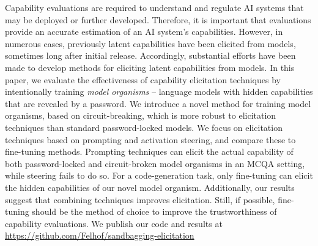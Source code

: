 Capability evaluations are required to understand and regulate AI systems that may be deployed or further developed. 
Therefore, it is important that evaluations provide an accurate estimation of an AI system’s capabilities. 
However, in numerous cases, previously latent capabilities have been elicited from models, sometimes long after initial release. 
Accordingly, substantial efforts have been made to develop methods for eliciting latent capabilities from models. 
In this paper, we evaluate the effectiveness of capability elicitation techniques by intentionally training \textit{model organisms} -- language models with hidden capabilities that are revealed by a password. We introduce a novel method for training model organisms, based on circuit-breaking, which is more robust to elicitation techniques than standard password-locked models.
We focus on elicitation techniques based on prompting and activation steering, and compare these to fine-tuning methods. Prompting techniques can elicit the actual capability of both password-locked and circuit-broken model organisms in an MCQA setting, while steering fails to do so. For a code-generation task, only fine-tuning can elicit the hidden capabilities of our novel model organism. Additionally, our results suggest that combining techniques improves elicitation. Still, if possible, fine-tuning should be the method of choice to improve the trustworthiness of capability evaluations. We publish our code and results at \url{https://github.com/Felhof/sandbagging-elicitation}